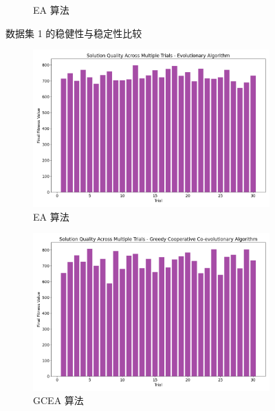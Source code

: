 \documentclass[12pt,a4paper,oneside]{ctexart}
\begin{document}
\begin{appendices}
\begin{figure}[h!]
\begin{subfigure}{0.32\textwidth}
			\caption{EA 算法}
		\end{subfigure}
		\caption{数据集 1 的稳健性与稳定性比较}
		\label{fig:dataset1_stability}
	\end{figure}
	
	
	
	\begin{figure}[h!]
		\centering
		\begin{subfigure}{0.32\textwidth}
			\includegraphics[width=\textwidth]{fig/17.png}
			\caption{EA 算法}
		\end{subfigure}
		\begin{subfigure}{0.32\textwidth}
			\includegraphics[width=\textwidth]{fig/24.png}
			\caption{GCEA 算法}
		\end{subfigure}
		\begin{subfigure}{0.32\textwidth}

\end{subfigure}
\end{figure}
\end{appendices}
\end{document}
